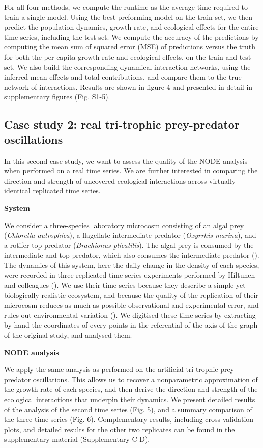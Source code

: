 \documentclass[11pt, oneside]{article}
\begin{document}
For all four methods, we compute the runtime as the average time required to train a single model.
Using the best preforming model on the train set, we then predict the population dynamics, growth rate, and ecological effects for the entire time series, including the test set.
We compute the accuracy of the predictions by computing the mean sum of squared error (MSE) of predictions versus the truth for both the per capita growth rate and ecological effects, on the train and test set.
We also build the corresponding dynamical interaction networks, using the inferred mean effects and total contributions, and compare them to the true network of interactions.
Results are shown in figure 4 and presented in detail in supplementary figures (Fig. S1-5).

\subsection{Case study 2: real tri-trophic prey-predator oscillations}

In this second case study, we want to assess the quality of the NODE analysis when performed on a real time series.
We are further interested in comparing the direction and strength of uncovered ecological interactions across virtually identical replicated time series.

\textbf{System}

We consider a three-species laboratory microcosm consisting of an algal prey (\textit{Chlorella autrophica}), a flagellate intermediate predator (\textit{Oxyrrhis marina}), and a rotifer top predator (\textit{Brachionus plicatilis}).
The algal prey is consumed by the intermediate and top predator, which also consumes the intermediate predator (\cite{Arndt1993}).
The dynamics of this system, here the daily change in the density of each species, were recorded in three replicated time series experiments performed by Hiltunen and colleagues (\cite{Hiltunen2013}). 
We use their time series because they describe a simple yet biologically realistic ecosystem, and because the quality of the replication of their microcosm reduces as much as possible observational and experimental error, and rules out environmental variation (\cite{Hiltunen2013}).
We digitised these time series by extracting by hand the coordinates of every points in the referential of the axis of the graph of the original study, and analysed them.

\textbf{NODE analysis}

We apply the same analysis as performed on the artificial tri-trophic prey-predator oscillations.
This allows us to recover a nonparametric approximation of the growth rate of each species, and then derive the direction and strength of the ecological interactions that underpin their dynamics.
We present detailed results of the analysis of the second time series (Fig. 5), and a summary comparison of the three time series (Fig. 6).
Complementary results, including cross-validation plots, and detailed results for the other two replicates can be found in the supplementary material (Supplementary C-D).
\end{document}
